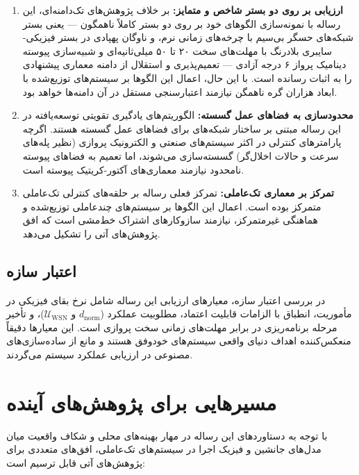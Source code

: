 \documentclass[oneside,openany,phd]{TMU-Thesis}
\begin{document}
\begin{enumerate}
  \item \textbf{ارزیابی بر روی دو بستر شاخص و متمایز:} بر خلاف پژوهش‌های تک‌دامنه‌ای، این رساله با نمونه‌سازی الگوهای خود بر روی دو بستر کاملاً ناهمگون — یعنی بستر شبکه‌های حسگر بی‌سیم  با چرخه‌های زمانی نرم، و ناوگان پهپادی در بستر فیزیکی-سایبری بلادرنگ  با مهلت‌های سخت ۲۰ تا ۵۰ میلی‌ثانیه‌ای و شبیه‌سازی پیوسته دینامیک پرواز ۶ درجه آزادی — تعمیم‌پذیری و استقلال از دامنه معماری پیشنهادی را به اثبات رسانده است. با این حال، اعمال این الگوها بر سیستم‌های توزیع‌شده با ابعاد هزاران گره ناهمگن نیازمند اعتبارسنجی مستقل در آن دامنه‌ها خواهد بود.
  \item \textbf{محدودسازی به فضاهای عمل گسسته:} الگوریتم‌های یادگیری تقویتی توسعه‌یافته در این رساله مبتنی بر ساختار شبکه‌های  برای فضاهای عمل گسسته هستند. اگرچه پارامترهای کنترلی در اکثر سیستم‌های صنعتی و الکترونیک پروازی (نظیر پله‌های سرعت و حالات اخلال‌گر) گسسته‌سازی می‌شوند، اما تعمیم به فضاهای پیوسته نامحدود نیازمند معماری‌های آکتور-کریتیک پیوسته است.
  \item \textbf{تمرکز بر معماری تک‌عاملی:} تمرکز فعلی رساله بر حلقه‌های کنترلی تک‌عاملی متمرکز بوده است. اعمال این الگوها بر سیستم‌های چندعاملی توزیع‌شده و هماهنگی غیرمتمرکز، نیازمند سازوکارهای اشتراک خط‌مشی است که افق پژوهش‌های آتی را تشکیل می‌دهد.
\end{enumerate}

\subsection{اعتبار سازه}
در بررسی اعتبار سازه، معیارهای ارزیابی این رساله شامل نرخ بقای فیزیکی در مأموریت، انطباق با الزامات قابلیت اعتماد، مطلوبیت عملکرد ($d_{\text{norm}}$ و $\mathcal{U}_{\text{WSN}}$)، و تأخیر مرحله برنامه‌ریزی در برابر مهلت‌های زمانی سخت پروازی است. این معیارها دقیقاً منعکس‌کننده اهداف دنیای واقعی سیستم‌های خودوفق هستند و مانع از ساده‌سازی‌های مصنوعی در ارزیابی عملکرد سیستم می‌گردند.

\section{مسیرهایی برای پژوهش‌های آینده}

با توجه به دستاوردهای این رساله در مهار بهینه‌های محلی و شکاف واقعیت میان مدل‌های جانشین و فیزیک اجرا در سیستم‌های تک‌عاملی، افق‌های متعددی برای پژوهش‌های آتی قابل ترسیم است:
\end{document}
